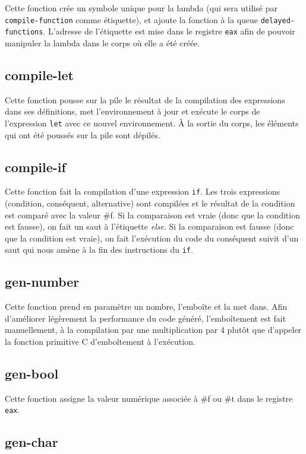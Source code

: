 \documentclass[11pt]{report}
\begin{document}
Cette fonction crée un symbole unique pour la lambda (qui sera utilisé
par {\tt compile-function} comme étiquette), et ajoute la fonction à
la queue {\tt delayed-functions}.  L'adresse de l'étiquette est mise
dans le registre {\tt eax} afin de pouvoir manipuler la lambda dans le
corps où elle a été créée.

\subsection{compile-let}

Cette fonction pousse sur la pile le résultat de la compilation des
expressions dans ses définitions, met l'environnement à jour et
exécute le corps de l'expression {\tt let} avec ce nouvel
environnement.  À la sortie du corps, les éléments qui ont été poussés
sur la pile sont dépilés.

\subsection{compile-if}

Cette fonction fait la compilation d'une expression {\tt if}. Les
trois expressions (condition, conséquent, alternative) sont compilées
et le résultat de la condition est comparé avec la valeur \#f. Si la
comparaison est vraie (donc que la condition est fausse), on fait un
saut à l'étiquette {\it else}. Si la comparaison est fausse (donc que
la condition est vraie), on fait l'exécution du code du conséquent
suivit d'un saut qui nous amène à la fin des instructions du {\tt if}.

\subsection{gen-number}

Cette fonction prend en paramètre un nombre, l'emboîte et la met dans.
Afin d'améliorer légèrement la performance du code généré,
l'emboîtement est fait manuellement, à la compilation par une
multiplication par 4 plutôt que d'appeler la fonction primitive C
d'emboîtement à l'exécution.

\subsection{gen-bool}

Cette fonction assigne la valeur numérique associée à \#f ou \#t dans
le registre {\tt eax}.

\subsection{gen-char}
\end{document}
